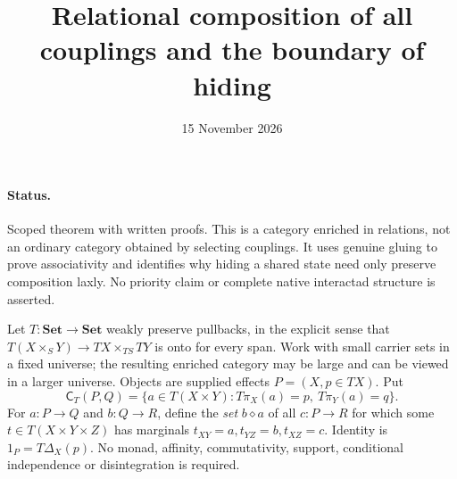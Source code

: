 \documentclass[11pt]{article}
\title{Relational composition of all couplings and the boundary of hiding}
\date{15 November 2026}
\begin{document}
\maketitle
\paragraph{Status.} Scoped theorem with written proofs. This is a category enriched in relations, not an ordinary category obtained by selecting couplings. It uses genuine gluing to prove associativity and identifies why hiding a shared state need only preserve composition laxly. No priority claim or complete native interactad structure is asserted.

Let $T:\mathbf{Set}\to\mathbf{Set}$ weakly preserve pullbacks, in the explicit sense that $T(X\times_S Y)\to TX\times_{TS}TY$ is onto for every span. Work with small carrier sets in a fixed universe; the resulting enriched category may be large and can be viewed in a larger universe. Objects are supplied effects $P=(X,p\in TX)$. Put
\[
 \mathsf C_T(P,Q)=\{a\in T(X\times Y):T\pi_X(a)=p,\ T\pi_Y(a)=q\}.
\]
For $a:P\to Q$ and $b:Q\to R$, define the \emph{set} $b\diamond a$ of all $c:P\to R$ for which some $t\in T(X\times Y\times Z)$ has marginals $t_{XY}=a,t_{YZ}=b,t_{XZ}=c$. Identity is $1_P=T\Delta_X(p)$. No monad, affinity, commutativity, support, conditional independence or disintegration is required.
\end{document}
